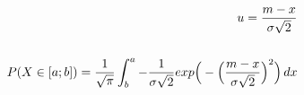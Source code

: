 \documentclass[preview]{standalone}
\begin{document}
\begin{align*}
u = {{m-x} \over {\sigma \sqrt{2}} }\\ \\ P( X \in [a;b] ) = { \frac{1}{\sqrt{\pi}} } \int_b^a { { - \frac{1}{\sigma \sqrt{2}} } exp\Big(-{ \Big( \frac{m - x}{\sigma \sqrt{2}} \Big)^2 }\Big) } \, dx
\end{align*}
\end{document}
